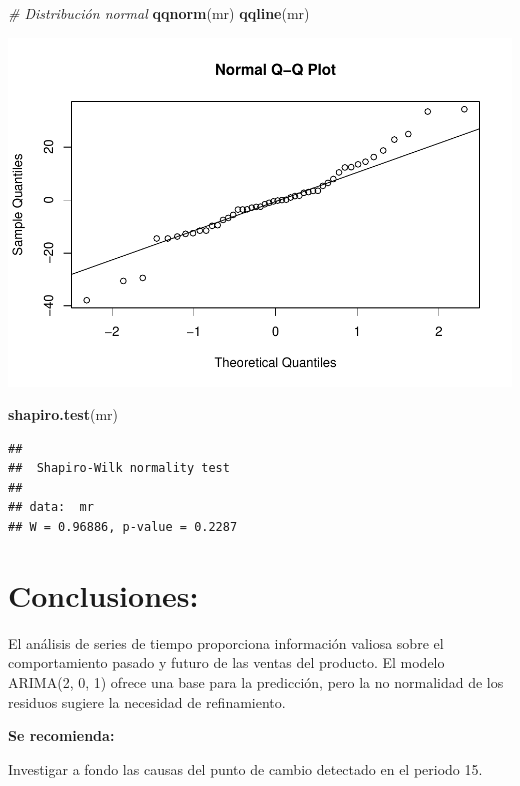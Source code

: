 \documentclass[
]{book}
\newenvironment{Shaded}{\begin{snugshade}}{\end{snugshade}}
\newcommand{\CommentTok}[1]{\textcolor[rgb]{0.56,0.35,0.01}{\textit{#1}}}
\newcommand{\FunctionTok}[1]{\textcolor[rgb]{0.13,0.29,0.53}{\textbf{#1}}}
\newcommand{\NormalTok}[1]{#1}
\begin{document}
\begin{Shaded}
\begin{Highlighting}[]
\CommentTok{\# Distribución normal}
\FunctionTok{qqnorm}\NormalTok{(mr)}
\FunctionTok{qqline}\NormalTok{(mr)}
\end{Highlighting}
\end{Shaded}

\includegraphics{_main_files/figure-latex/unnamed-chunk-21-2.pdf}

\begin{Shaded}
\begin{Highlighting}[]
\FunctionTok{shapiro.test}\NormalTok{(mr)}
\end{Highlighting}
\end{Shaded}

\begin{verbatim}
## 
##  Shapiro-Wilk normality test
## 
## data:  mr
## W = 0.96886, p-value = 0.2287
\end{verbatim}

\section{Conclusiones:}\label{conclusiones}

El análisis de series de tiempo proporciona información valiosa sobre el comportamiento pasado y futuro de las ventas del producto. El modelo ARIMA(2, 0, 1) ofrece una base para la predicción, pero la no normalidad de los residuos sugiere la necesidad de refinamiento.

\textbf{Se recomienda:}

Investigar a fondo las causas del punto de cambio detectado en el periodo 15.
\end{document}
